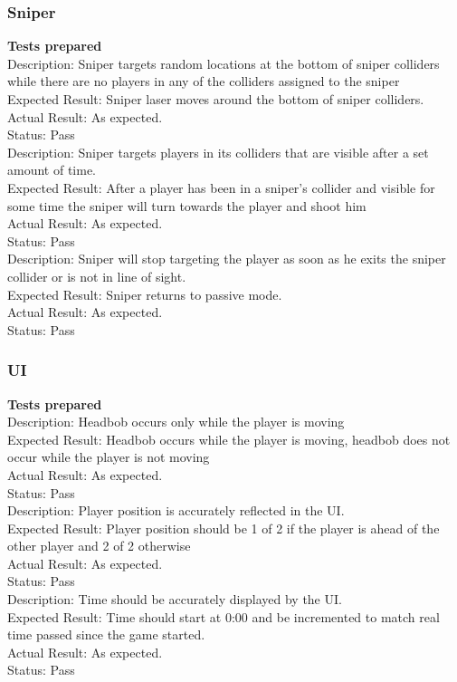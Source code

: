 \documentclass[11pt,a4paper]{article}
\begin{document}
\subsubsection{Sniper}
\textbf{Tests prepared}\\
Description: Sniper targets random locations at the bottom of sniper colliders while there are no players in any of the colliders assigned to the sniper\\
Expected Result: Sniper laser moves around the bottom of sniper colliders.\\
Actual Result: As expected.\\
Status: Pass
\smallskip\\
Description: Sniper targets players in its colliders that are visible after a set amount of time.\\
Expected Result: After a player has been in a sniper's collider and visible for some time the sniper will turn towards the player and shoot him\\
Actual Result: As expected.\\
Status: Pass
\smallskip\\
Description: Sniper will stop targeting the player as soon as he exits the sniper collider or is not in line of sight.\\
Expected Result: Sniper returns to passive mode.\\
Actual Result: As expected.\\
Status: Pass
\subsubsection{UI}
\textbf{Tests prepared}\\
Description: Headbob occurs only while the player is moving\\
Expected Result: Headbob occurs while the player is moving, headbob does not occur while the player is not moving\\
Actual Result: As expected.\\
Status: Pass
\smallskip\\
Description: Player position is accurately reflected in the UI.\\
Expected Result: Player position should be 1 of 2 if the player is ahead of the other player and 2 of 2 otherwise\\
Actual Result: As expected.\\
Status: Pass
\smallskip\\
Description: Time should be accurately displayed by the UI.\\
Expected Result: Time should start at 0:00 and be incremented to match real time passed since the game started.\\
Actual Result: As expected.\\
Status: Pass
\end{document}
